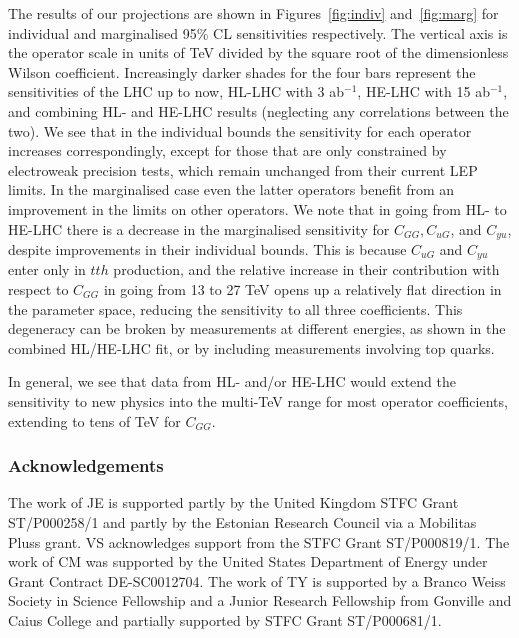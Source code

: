 \documentclass[../report.tex]{subfiles}
\begin{document}
The results of our projections are shown in Figures~\ref{fig:indiv} and~\ref{fig:marg} for individual and marginalised 95\% CL sensitivities respectively. The vertical axis is the operator scale in units of TeV divided by the square root of the dimensionless Wilson coefficient. Increasingly darker shades for the four bars represent the sensitivities of the LHC up to now, HL-LHC with 3 ab$^{-1}$, HE-LHC with 15 ab$^{-1}$, and combining HL- and HE-LHC results (neglecting any correlations between the two). We see that in the individual bounds the sensitivity for each operator increases correspondingly, except for those that are only constrained by electroweak precision tests, which remain unchanged from their current LEP limits. In the marginalised case even the latter operators benefit from an improvement in the limits on other operators. We note that in going from HL- to HE-LHC there is a decrease in the marginalised sensitivity for $C_{GG}, C_{uG}$, and $C_{yu}$, despite improvements in their individual bounds. This is because $C_{uG}$ and $C_{yu}$ enter only in $tth$ production, and the relative increase in their contribution with respect to $C_{GG}$ in going from 13 to 27 TeV opens up a relatively flat direction in the parameter space, reducing the sensitivity to all three coefficients. This degeneracy can be broken by measurements at different energies, as shown in the combined HL/HE-LHC fit, or by including measurements involving top quarks.

In general, we see that data from HL- and/or HE-LHC would extend the sensitivity to new physics into the multi-TeV range
for most operator coefficients, extending to tens of TeV for $C_{GG}$.



\subsubsection*{Acknowledgements}
The work of JE is supported partly by the United Kingdom STFC Grant ST/P000258/1 and partly by the Estonian Research Council via a Mobilitas Pluss grant. VS acknowledges support from the STFC Grant ST/P000819/1. The work of CM was supported by the United States Department of Energy under Grant Contract DE-SC0012704. The work of TY is supported by a Branco Weiss Society in Science Fellowship and a Junior Research Fellowship from Gonville and Caius College and partially supported by STFC Grant ST/P000681/1.
\end{document}
